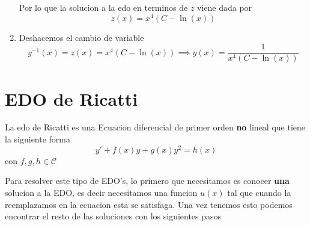 \documentclass[a4paper,oneside,10.5pt]{article}
\begin{document}
\begin{enumerate}
        Por lo que la solucion a la edo en terminos de $z$ viene dada por
        \begin{equation*}
          z(x) = x^{4}(C - \ln(x))
        \end{equation*}

  \item Deshacemos el cambio de variable
        \begin{equation*}
          y^{-1}(x) = z(x) = x^{4}(C - \ln(x)) \implies y(x) = \frac{1}{x^{4}(C - \ln(x))}
        \end{equation*}

\end{enumerate}

\section*{EDO de Ricatti}
La edo de Ricatti es una Ecuacion diferencial de primer orden \textbf{no} lineal que tiene la siguiente forma
\begin{equation*}
  y' + f(x) y + g(x) y^{2} = h(x)
\end{equation*}
con $f, g, h \in \mathcal{C}$

Para resolver este tipo de EDO's, lo primero que necesitamos es conocer \textbf{una} solucion a la EDO, es decir necesitamos una funcion $u(x)$ tal que cuando la reemplazamos en la ecuacion esta se satisfaga. Una vez tenemos esto podemos encontrar el resto de las soluciones con los siguientes pasos
\end{document}
